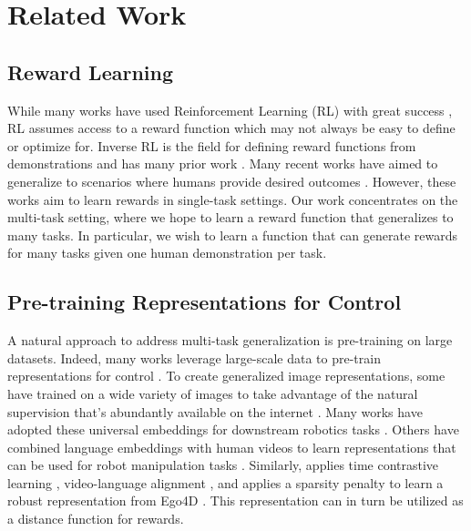 \section{Related Work}
\label{sec:related_work_reward}

\subsection{Reward Learning}

While many works have used Reinforcement Learning (RL) with great success \cite{silver2017alphago, Vinyals2019GrandmasterLI, rma, agarwal2023legged}, RL assumes access to a reward function which may not always be easy to define or optimize for. Inverse RL is the field for defining reward functions from demonstrations and has many prior work \cite{ziebart2008maximum, ratliff2006mmp, wulfmeier2015DeepIRL, levine2018maxent}. Many recent works have aimed to generalize to scenarios where humans provide desired outcomes \cite{fu2018variational, singh2019end}. However, these works aim to learn rewards in single-task settings. Our work concentrates on the multi-task setting, where we hope to learn a reward function that generalizes to many tasks. In particular, we wish to learn a function that can generate rewards for many tasks given one human demonstration per task.


\subsection{Pre-training Representations for Control} 

A natural approach to address multi-task generalization is pre-training on large datasets. Indeed, many works  leverage large-scale data to pre-train representations for control \cite{Parisi2022TheUE, Cui2022CanFM, r3m, VIP, shah2021rrl, radasavovic22robotmaskedpretraining}. To create generalized image representations, some have trained on a wide variety of images to take advantage of the natural supervision that’s abundantly available on the internet \cite{radford21clip}. Many works have adopted these universal embeddings for downstream robotics tasks \cite{shridhar2022cliport, jang2022bc}. Others have combined language embeddings with human videos to learn representations that can be used for robot manipulation tasks \cite{shao2021concept2robot}. Similarly, \cite{r3m} applies time contrastive learning \cite{sermanet18timecontrastive}, video-language alignment \cite{nair2021lorel}, and applies a sparsity penalty to learn a robust representation from Ego4D \cite{ego4d}. This representation can in turn be utilized as a distance function for rewards.

